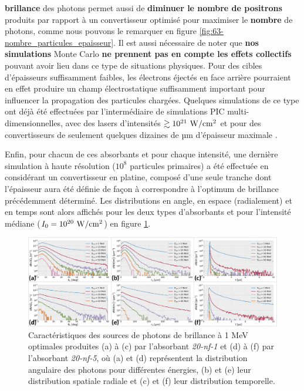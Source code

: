 \begin{refsection}
\textbf{brillance} des photons permet aussi de \textbf{diminuer le nombre de positrons} produits par rapport à un convertisseur optimisé pour maximiser le \textbf{nombre} de photons, comme nous pouvons le remarquer en figure \ref{fig:63-nombre_particules_epaisseur}. Il est aussi nécessaire de noter que \textbf{nos simulations} Monte Carlo \textbf{ne prennent pas en compte les effets collectifs} pouvant avoir lieu dans ce type de situations physiques. Pour des cibles d'épaisseurs suffisamment faibles, les électrons éjectés en face arrière pourraient en effet produire un champ électrostatique suffisamment important pour influencer la propagation des particules chargées. Quelques simulations de ce type ont déjà été effectuées par l’intermédiaire de simulations PIC multi-dimensionnelles, avec des lasers d'intensités $\gtrsim 10^{21} ~ \rm W/cm^2$ et pour des convertisseurs de seulement quelques dizaines de µm d'épaisseur maximale \parencite{vyskocil_2018, martinez_2020}.

Enfin, pour chacun de ces absorbants et pour chaque intensité, une dernière simulation à haute résolution ($10^8$ particules primaires) a été effectuée en considérant un convertisseur en platine, composé d'une seule tranche dont l'épaisseur aura été définie de façon à correspondre à l'optimum de brillance précédemment déterminé. Les distributions en angle, en espace (radialement) et en temps sont alors affichés pour les deux types d'absorbants et pour l'intensité médiane ($I_0=10^{20} ~ \rm W/cm^2$) en figure \ref{fig:63-source_gamma_opti}.

\begin{figure}[hbtp]
	\centering
	\includegraphics[width=\linewidth]{6-opti_numerique/source_gamma_opti.png}
	\caption{Caractéristiques des sources de photons de brillance à 1 MeV optimales produites (a) à (c) par l'absorbant \textit{20-nf-1} et (d) à (f) par l'absorbant \textit{20-nf-5}, où (a) et (d) représentent la distribution angulaire des photons pour différentes énergies, (b) et (e) leur distribution spatiale radiale et (c) et (f) leur distribution temporelle.}
	\label{fig:63-source_gamma_opti}
\end{figure}


\end{refsection}
